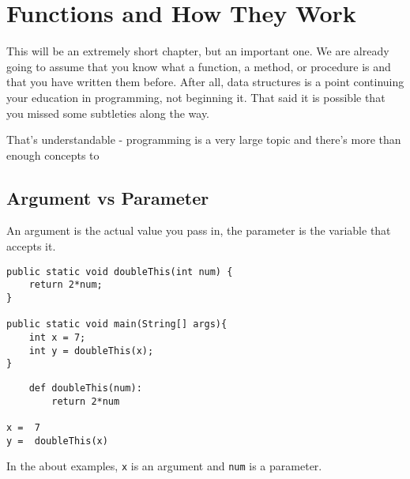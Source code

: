 \chapter{Functions and How They Work}

This will be an extremely short chapter, but an important one.
We are already going to assume that you know what a function, a method, or procedure is and that you have written them before.
After all, data structures is a point continuing your education in programming, not beginning it.
That said it is possible that you missed some subtleties along the way.

That's understandable -  programming is a very large topic and there's more than enough concepts to  








\section{Argument vs Parameter}
An argument is the actual value you pass in, the parameter is the variable that accepts it.


\begin{verbatim}
public static void doubleThis(int num) { 
	return 2*num;
}

public static void main(String[] args){
	int x = 7;
	int y = doubleThis(x);
}

\end{verbatim}

\begin{verbatim}
	def doubleThis(num): 
		return 2*num
		
x =  7
y =  doubleThis(x)
\end{verbatim}

In the about examples, \texttt{x} is an argument and \texttt{num} is a parameter.


